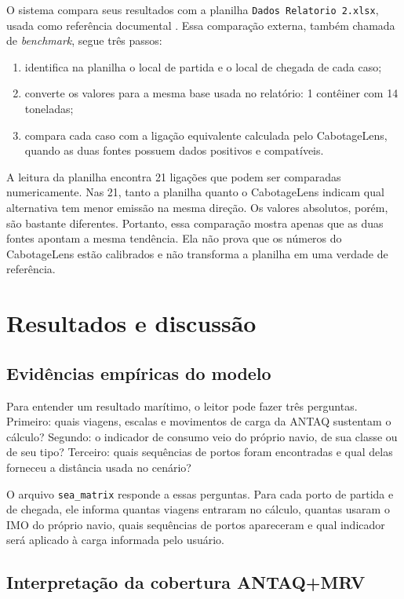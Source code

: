 \documentclass[12pt,a4paper]{report}
\begin{document}
O sistema compara seus resultados com a planilha \texttt{Dados Relatorio 2.xlsx}, usada como referência documental \citep{workbookdados}. Essa comparação externa, também chamada de \emph{benchmark}, segue três passos:

\begin{enumerate}
  \item identifica na planilha o local de partida e o local de chegada de cada caso;
  \item converte os valores para a mesma base usada no relatório: \num{1} contêiner com \num{14} toneladas;
  \item compara cada caso com a ligação equivalente calculada pelo CabotageLens, quando as duas fontes possuem dados positivos e compatíveis.
\end{enumerate}

A leitura da planilha encontra 21 ligações que podem ser comparadas numericamente. Nas 21, tanto a planilha quanto o CabotageLens indicam qual alternativa tem menor emissão na mesma direção. Os valores absolutos, porém, são bastante diferentes. Portanto, essa comparação mostra apenas que as duas fontes apontam a mesma tendência. Ela não prova que os números do CabotageLens estão calibrados e não transforma a planilha em uma verdade de referência.

\chapter{Resultados e discussão}
\label{chap:resultados}

\section{Evidências empíricas do modelo}

Para entender um resultado marítimo, o leitor pode fazer três perguntas. Primeiro: quais viagens, escalas e movimentos de carga da ANTAQ sustentam o cálculo? Segundo: o indicador de consumo veio do próprio navio, de sua classe ou de seu tipo? Terceiro: quais sequências de portos foram encontradas e qual delas forneceu a distância usada no cenário?

O arquivo \texttt{sea\_matrix} responde a essas perguntas. Para cada porto de partida e de chegada, ele informa quantas viagens entraram no cálculo, quantas usaram o IMO do próprio navio, quais sequências de portos apareceram e qual indicador será aplicado à carga informada pelo usuário.

\section{Interpretação da cobertura ANTAQ+MRV}
\end{document}
